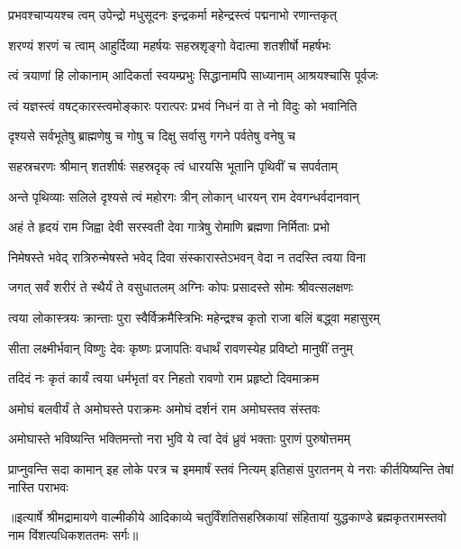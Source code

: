 \twolineshloka
{प्रभवश्चाप्ययश्च त्वम् उपेन्द्रो मधुसूदनः}
{इन्द्रकर्मा महेन्द्रस्त्वं पद्मनाभो रणान्तकृत्}%


\twolineshloka
{शरण्यं शरणं च त्वाम् आहुर्दिव्या महर्षयः}
{सहस्रशृङ्गो वेदात्मा शतशीर्षो महर्षभः}%


\twolineshloka
{त्वं त्रयाणां हि लोकानाम् आदिकर्ता स्वयम्प्रभुः}
{सिद्धानामपि साध्यानाम् आश्रयश्चासि पूर्वजः}%


\twolineshloka
{त्वं यज्ञस्त्वं वषट्कारस्त्वमोङ्कारः परात्परः}
{प्रभवं निधनं वा ते नो विदुः को भवानिति}%


\twolineshloka
{दृश्यसे सर्वभूतेषु ब्राह्मणेषु च गोषु च}
{दिक्षु सर्वासु गगने पर्वतेषु वनेषु च}%


\twolineshloka
{सहस्रचरणः श्रीमान् शतशीर्षः सहस्रदृक्}
{त्वं धारयसि भूतानि पृथिवीं च सपर्वताम्}%


\twolineshloka
{अन्ते पृथिव्याः सलिले दृश्यसे त्वं महोरगः}
{त्रीन् लोकान् धारयन् राम देवगन्धर्वदानवान्}%


\twolineshloka
{अहं ते हृदयं राम जिह्वा देवी सरस्वती}
{देवा गात्रेषु रोमाणि ब्रह्मणा निर्मिताः प्रभो}%


\twolineshloka
{निमेषस्ते भवेद् रात्रिरुन्मेषस्ते भवेद् दिवा}
{संस्कारास्तेऽभवन् वेदा न तदस्ति त्वया विना}%


\twolineshloka
{जगत् सर्वं शरीरं ते स्थैर्यं ते वसुधातलम्}
{अग्निः कोपः प्रसादस्ते सोमः श्रीवत्सलक्षणः}%


\twolineshloka
{त्वया लोकास्त्रयः क्रान्ताः पुरा स्वैर्विक्रमैस्त्रिभिः}
{महेन्द्रश्च कृतो राजा बलिं बद्\mbox{}ध्वा महासुरम्}%


\twolineshloka
{सीता लक्ष्मीर्भवान् विष्णुः देवः कृष्णः प्रजापतिः}
{वधार्थं रावणस्येह प्रविष्टो मानुषीं तनुम्}%


\twolineshloka
{तदिदं नः कृतं कार्यं त्वया धर्मभृतां वर}
{निहतो रावणो राम प्रहृष्टो दिवमाक्रम}%


\twolineshloka
{अमोघं बलवीर्यं ते अमोघस्ते पराक्रमः}
{अमोघं दर्शनं राम अमोघस्तव संस्तवः}%


\twolineshloka
{अमोघास्ते भविष्यन्ति भक्तिमन्तो नरा भुवि}
{ये त्वां देवं ध्रुवं भक्ताः पुराणं पुरुषोत्तमम्}%


\threelineshloka
{प्राप्नुवन्ति सदा कामान् इह लोके परत्र च}
{इममार्षं स्तवं नित्यम् इतिहासं पुरातनम्}
{ये नराः कीर्तयिष्यन्ति तेषां नास्ति पराभवः} %

॥इत्यार्षे श्रीमद्रामायणे वाल्मीकीये आदिकाव्ये चतुर्विंशतिसहस्रिकायां संहितायां युद्धकाण्डे ब्रह्मकृतरामस्तवो नाम विंशत्यधिकशततमः सर्गः॥
